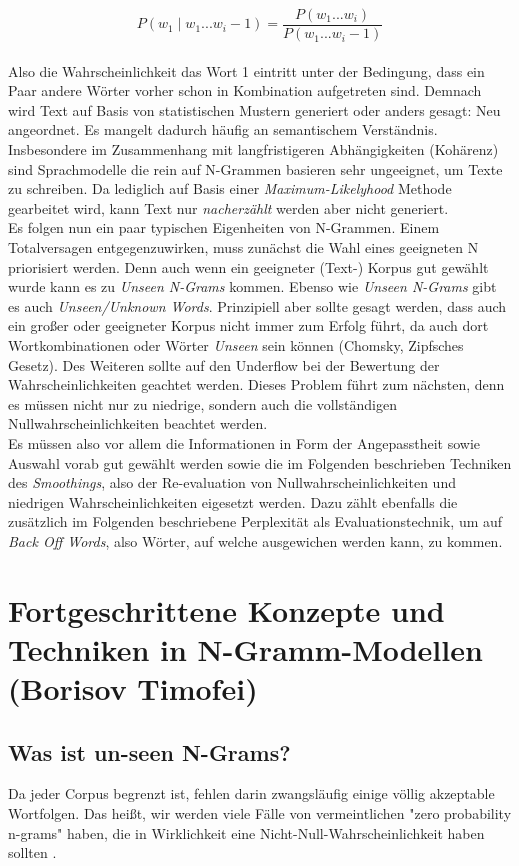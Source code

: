 \documentclass[12pt]{article}
\begin{document}
\begin{equation}
	P(w_1 \mid w_1...w_i-1) = \frac {P(w_1...w_i)}{P(w_1...w_i-1)}
\end{equation}
\\
Also die Wahrscheinlichkeit das Wort 1 eintritt unter der Bedingung, dass ein Paar andere Wörter vorher
schon in Kombination aufgetreten sind. Demnach wird Text auf Basis von statistischen Mustern generiert
oder anders gesagt: Neu angeordnet. Es mangelt dadurch häufig an semantischem Verständnis. Insbesondere
im Zusammenhang mit langfristigeren Abhängigkeiten (Kohärenz) sind Sprachmodelle die rein auf N-Grammen
basieren sehr ungeeignet, um Texte zu schreiben. Da lediglich auf Basis einer \textit{Maximum-Likelyhood} Methode
gearbeitet wird, kann Text nur \textit{nacherzählt} werden aber nicht generiert.\\
Es folgen nun ein paar typischen Eigenheiten von N-Grammen. Einem Totalversagen entgegenzuwirken, muss
zunächst die Wahl eines geeigneten N priorisiert werden. Denn auch wenn ein geeigneter (Text-) Korpus
gut gewählt wurde kann es zu \textit{Unseen N-Grams} kommen. Ebenso wie \textit{Unseen N-Grams} gibt es
auch \textit{Unseen/Unknown Words}. Prinzipiell aber sollte gesagt werden, dass auch ein großer oder geeigneter Korpus nicht immer zum
Erfolg führt, da auch dort Wortkombinationen oder Wörter \textit{Unseen} sein können (Chomsky, Zipfsches Gesetz).
Des Weiteren sollte auf den Underflow bei der Bewertung der Wahrscheinlichkeiten geachtet werden. Dieses
Problem führt zum nächsten, denn es müssen nicht nur zu niedrige, sondern auch die vollständigen
Nullwahrscheinlichkeiten beachtet werden.\\
Es müssen also vor allem die Informationen in Form der Angepasstheit sowie Auswahl vorab gut gewählt werden
sowie die im Folgenden beschrieben Techniken des \textit{Smoothings}, also der Re-evaluation von
Nullwahrscheinlichkeiten und niedrigen Wahrscheinlichkeiten eigesetzt werden. Dazu zählt ebenfalls die
zusätzlich im Folgenden beschriebene Perplexität als Evaluationstechnik, um auf \textit{Back Off Words}, also
Wörter, auf welche ausgewichen werden kann, zu kommen.


\section{Fortgeschrittene Konzepte und Techniken in N-Gramm-Modellen (Borisov Timofei)}
\subsection{Was ist un-seen N-Grams?}
Da jeder Corpus begrenzt ist, fehlen darin zwangsläufig einige völlig akzeptable Wortfolgen. Das heißt, wir werden viele Fälle von vermeintlichen "zero probability n-grams" haben, die in Wirklichkeit eine Nicht-Null-Wahrscheinlichkeit haben sollten \cite{jurafsky2023}.
\end{document}

